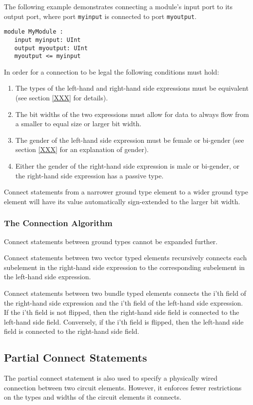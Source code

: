 \documentclass[12pt]{article}
\begin{document}
The following example demonstrates connecting a module's input port to its output port, where port \verb|myinput| is connected to port \verb|myoutput|.
\begin{verbatim}
module MyModule :
   input myinput: UInt
   output myoutput: UInt
   myoutput <= myinput
\end{verbatim}

In order for a connection to be legal the following conditions must hold:
\begin{enumerate}
\item The types of the left-hand and right-hand side expressions must be equivalent (see section \ref{XXX} for details).
\item The bit widths of the two expressions must allow for data to always flow from a smaller to equal size or larger bit width.
\item The gender of the left-hand side expression must be female or bi-gender (see section \ref{XXX} for an explanation of gender).
\item Either the gender of the right-hand side expression is male or bi-gender, or the right-hand side expression has a passive type.
\end{enumerate}

Connect statements from a narrower ground type element to a wider ground type element will have its value automatically sign-extended to the larger bit width. 

\subsubsection{The Connection Algorithm}
Connect statements between ground types cannot be expanded further. 

Connect statements between two vector typed elements recursively connects each subelement in the right-hand side expression to the corresponding subelement in the left-hand side expression. 

Connect statements between two bundle typed elements connects the i'th field of the right-hand side expression and the i'th field of the left-hand side expression. If the i'th field is not flipped, then the right-hand side field is connected to the left-hand side field. Conversely, if the i'th field is flipped, then the left-hand side field is connected to the right-hand side field.

\subsection{Partial Connect Statements}
The partial connect statement is also used to specify a physically wired connection between two circuit elements. However, it enforces fewer restrictions on the types and widths of the circuit elements it connects. 
\end{document}
